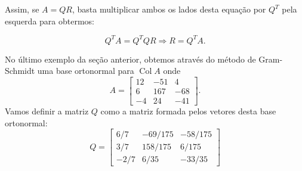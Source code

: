 \documentclass[../livro.tex]{subfiles}  %
\begin{document}
Assim, se $A=QR$, basta multiplicar ambos os lados desta equação por $Q^T$ pela esquerda para obtermos:

\begin{equation}Q^T A = Q^T Q R  \Longrightarrow R= Q^T A.\end{equation}






\vspace{0.3cm}



No último exemplo da seção anterior, obtemos através do método de Gram-Schmidt uma base ortonormal para $\operatorname{Col} A$
onde 
\begin{equation}
A =
\begin{bmatrix}
12 & -51 & 4 \\
6 & 167 & -68 \\
-4 & 24 & -41
\end{bmatrix}.
\end{equation}
Vamos definir a matriz $Q$ como a matriz formada pelos vetores desta base ortonormal:
\begin{equation}
Q =
\begin{bmatrix}
6/7 & -69/175 & -58/175 \\
3/7 & 158/175 & 6/175   \\
-2/7& 6/35   &-33/35
\end{bmatrix}
\end{equation} 
\end{document}
